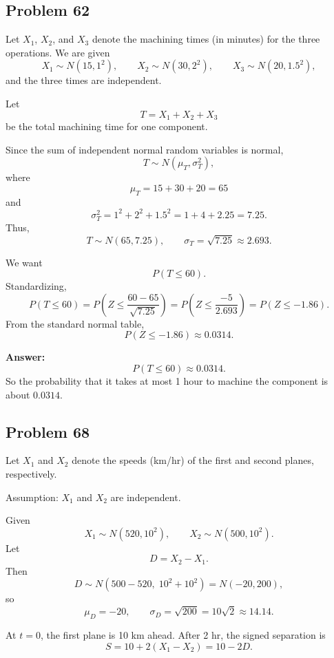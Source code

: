 \subsection*{Problem 62}

Let $X_1$, $X_2$, and $X_3$ denote the machining times (in minutes) for the three operations. We are given
\[
X_1\sim N(15,1^2), \qquad X_2\sim N(30,2^2), \qquad X_3\sim N(20,1.5^2),
\]
and the three times are independent.

Let
\[
T=X_1+X_2+X_3
\]
be the total machining time for one component.

Since the sum of independent normal random variables is normal,
\[
T\sim N(\mu_T,\sigma_T^2),
\]
where
\[
\mu_T=15+30+20=65
\]
and
\[
\sigma_T^2=1^2+2^2+1.5^2=1+4+2.25=7.25.
\]
Thus,
\[
T\sim N(65,7.25),
\qquad
\sigma_T=\sqrt{7.25}\approx 2.693.
\]

We want
\[
P(T\le 60).
\]
Standardizing,
\[
P(T\le 60)=P\left(Z\le \frac{60-65}{\sqrt{7.25}}\right)
= P\left(Z\le \frac{-5}{2.693}\right)
= P(Z\le -1.86).
\]
From the standard normal table,
\[
P(Z\le -1.86)\approx 0.0314.
\]

\textbf{Answer:}
\[
P(T\le 60)\approx 0.0314.
\]
So the probability that it takes at most 1 hour to machine the component is about $0.0314$.

\subsection*{Problem 68}

Let $X_1$ and $X_2$ denote the speeds (km/hr) of the first and second planes, respectively.

Assumption: $X_1$ and $X_2$ are independent.

Given
\[
X_1 \sim N(520,10^2), \qquad X_2 \sim N(500,10^2).
\]
Let
\[
D=X_2-X_1.
\]
Then
\[
D \sim N\!\left(500-520,\;10^2+10^2\right)=N(-20,200),
\]
so
\[
\mu_D=-20,\qquad \sigma_D=\sqrt{200}=10\sqrt{2}\approx 14.14.
\]

At $t=0$, the first plane is 10 km ahead. After 2 hr, the signed separation is
\[
S=10+2(X_1-X_2)=10-2D.
\]

